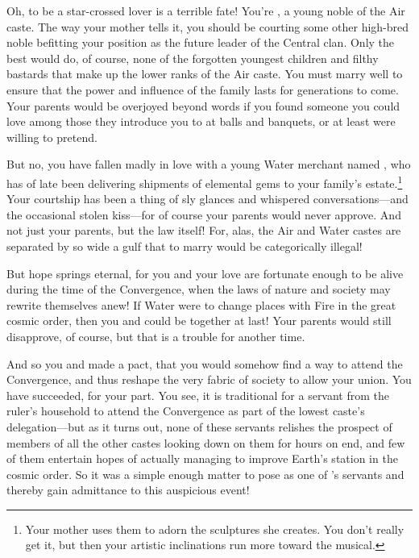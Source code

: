 \documentclass[char]{iron}
\begin{document}
\name{\cServant{}}



Oh, to be a star-crossed lover is a terrible fate! You're
\cServant{\real{\full}}, a young noble of the Air caste.  The way your
mother tells it, you should be courting some other high-bred noble
befitting your position as the future leader of the 
Central
\cServant{\real{\last}} clan.  Only the best would do, of course, none
of the forgotten youngest children and filthy bastards that make up
the lower ranks of the Air caste.  You must marry well to ensure
that the power and influence of the \cServant{\real{\last}} family
lasts for generations to come.  Your parents would be overjoyed
beyond words if you found someone you could love among those they
introduce you to at balls and banquets, or at least were willing
to pretend.

But no, you have
fallen madly in love with a young Water merchant named
\cGuildmaster{\real{\intro}}, who has of late been delivering
shipments of elemental gems to your family's estate.\footnote{Your
  mother uses them to adorn the sculptures she creates. You don't
  really get it, but then your artistic inclinations run more toward
  the musical.} Your courtship has been a thing of sly glances and
whispered conversations---and the occasional stolen kiss---for of
course your parents would never approve. And not just your parents,
but the law itself! For, alas, the Air and Water castes are separated
by so wide a gulf that to marry \cGuildmaster{\real{\first}} would be
categorically illegal!

But hope springs eternal, for you and your love are fortunate enough to be alive during the time of the Convergence, when the laws of nature and society may rewrite themselves anew! If Water were to change places with Fire in the great cosmic order, then you and \cGuildmaster{\real{\first}} could be together at last! Your parents would still disapprove, of course, but that is a trouble for another time.

And so you and \cGuildmaster{\real{\first}} made a pact, that you would somehow find a way to attend the Convergence, and thus reshape the very fabric of society to allow your union. You have succeeded, for your part. You see, it is traditional for a servant from the ruler's household to attend the Convergence as part of the lowest caste's delegation---but as it turns out, none of these servants relishes the prospect of members of all the other castes looking down on them for hours on end, and few of them entertain hopes of actually managing to improve Earth's station in the cosmic order. So it was a simple enough matter to pose as one of \cRoyalty{}'s servants and thereby gain admittance to this auspicious event!
\end{document}
